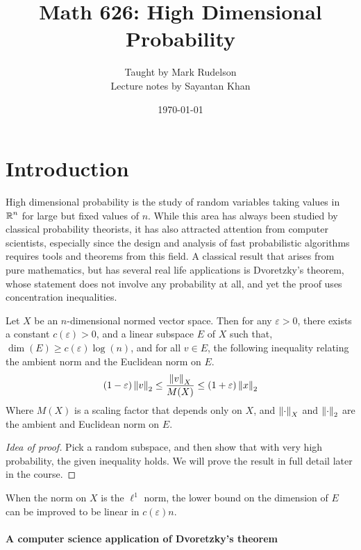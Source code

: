 \documentclass[11pt]{article}
\title{Math 626: High Dimensional Probability}
\author{Taught by Mark Rudelson \\ Lecture notes by Sayantan Khan}
\date{\today}
\begin{document}
\maketitle
\tableofcontents

\section{Introduction}
\label{sec:introduction}

High dimensional probability is the study of random variables taking values in $\operatorname{\mathbb{R}}^n$ for large but fixed values of $n$.
While this area has always been studied by classical probability theorists, it has also attracted attention from computer scientists, especially since the design and analysis of fast probabilistic algorithms requires tools and theorems from this field.
A classical result that arises from pure mathematics, but has several real life applications is Dvoretzky's theorem, whose statement does not involve any probability at all, and yet the proof uses concentration inequalities.
\begin{theorem}
  Let $X$ be an $n$-dimensional normed vector space. Then for any $\varepsilon > 0$, there exists a constant $c(\varepsilon) > 0$, and a linear subspace $E$ of $X$ such that, $\dim(E) \geq c(\varepsilon) \log(n)$, and for all $v \in E$, the following inequality relating the ambient norm and the Euclidean norm on $E$.
  \begin{align*}
    (1-\varepsilon) \left\lVert v\right\rVert_2 \leq \frac{\left\lVert v\right\rVert_X}{M(X)} \leq (1+\varepsilon)\left\lVert x\right\rVert_2
  \end{align*}
  Where $M(X)$ is a scaling factor that depends only on $X$, and $\left\lVert\cdot\right\rVert_X$ and $\left\lVert\cdot\right\rVert_2$ are the ambient and Euclidean norm on $E$.
\end{theorem}

\begin{proof}[Idea of proof]
  Pick a random subspace, and then show that with very high probability, the given inequality holds.
  We will prove the result in full detail later in the course.
\end{proof}

\begin{remark}
  \label{rem1}
  When the norm on $X$ is the $\ell^1$ norm, the lower bound on the dimension of $E$ can be improved to be linear in $c(\varepsilon) n$.
\end{remark}

\paragraph{A computer science application of Dvoretzky's theorem}
\end{document}
